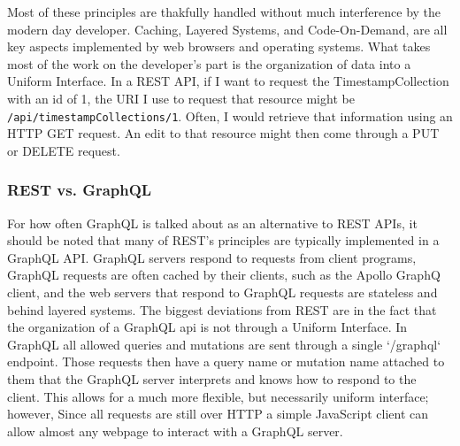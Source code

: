 Most of these principles are thakfully handled without much interference by the modern day developer. Caching, Layered Systems, and Code-On-Demand, are all key aspects implemented by web browsers and operating systems.  What takes most of the work on the developer's part is the organization of data into a Uniform Interface. In a REST API, if I want to request the TimestampCollection with an id of 1, the URI I use to request that resource might be \Verb"/api/timestampCollections/1".  Often, I would retrieve that information using an HTTP GET request.  An edit to that resource might then come through a PUT or DELETE request.

\subsubsection{REST vs. GraphQL}
For how often GraphQL is talked about as an alternative to REST APIs, it should be noted that many of REST's principles are typically implemented in a GraphQL API.  GraphQL servers respond to requests from client programs, GraphQL requests are often cached by their clients, such as the Apollo GraphQ client, and the web servers that respond to GraphQL requests are stateless and behind layered systems.  The biggest deviations from REST are in the fact that the organization of a GraphQL api is not through a Uniform Interface. In GraphQL all allowed queries and mutations are sent through a single `/graphql` endpoint.  Those requests then have a query name or mutation name attached to them that the GraphQL server interprets and knows how to respond to the client.  This allows for a much more flexible, but necessarily uniform interface; however,  Since all requests are still over HTTP a simple JavaScript client can allow almost any webpage to interact with a GraphQL server.